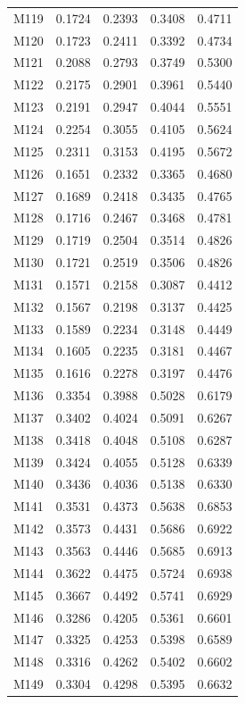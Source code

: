 \begin{longtable}{lrrrr}
M119 & 0.1724 & 0.2393 & 0.3408 & 0.4711 \\
M120 & 0.1723 & 0.2411 & 0.3392 & 0.4734 \\
M121 & 0.2088 & 0.2793 & 0.3749 & 0.5300 \\
M122 & 0.2175 & 0.2901 & 0.3961 & 0.5440 \\
M123 & 0.2191 & 0.2947 & 0.4044 & 0.5551 \\
M124 & 0.2254 & 0.3055 & 0.4105 & 0.5624 \\
M125 & 0.2311 & 0.3153 & 0.4195 & 0.5672 \\
M126 & 0.1651 & 0.2332 & 0.3365 & 0.4680 \\
M127 & 0.1689 & 0.2418 & 0.3435 & 0.4765 \\
M128 & 0.1716 & 0.2467 & 0.3468 & 0.4781 \\
M129 & 0.1719 & 0.2504 & 0.3514 & 0.4826 \\
M130 & 0.1721 & 0.2519 & 0.3506 & 0.4826 \\
M131 & 0.1571 & 0.2158 & 0.3087 & 0.4412 \\
M132 & 0.1567 & 0.2198 & 0.3137 & 0.4425 \\
M133 & 0.1589 & 0.2234 & 0.3148 & 0.4449 \\
M134 & 0.1605 & 0.2235 & 0.3181 & 0.4467 \\
M135 & 0.1616 & 0.2278 & 0.3197 & 0.4476 \\
M136 & 0.3354 & 0.3988 & 0.5028 & 0.6179 \\
M137 & 0.3402 & 0.4024 & 0.5091 & 0.6267 \\
M138 & 0.3418 & 0.4048 & 0.5108 & 0.6287 \\
M139 & 0.3424 & 0.4055 & 0.5128 & 0.6339 \\
M140 & 0.3436 & 0.4036 & 0.5138 & 0.6330 \\
M141 & 0.3531 & 0.4373 & 0.5638 & 0.6853 \\
M142 & 0.3573 & 0.4431 & 0.5686 & 0.6922 \\
M143 & 0.3563 & 0.4446 & 0.5685 & 0.6913 \\
M144 & 0.3622 & 0.4475 & 0.5724 & 0.6938 \\
M145 & 0.3667 & 0.4492 & 0.5741 & 0.6929 \\
M146 & 0.3286 & 0.4205 & 0.5361 & 0.6601 \\
M147 & 0.3325 & 0.4253 & 0.5398 & 0.6589 \\
M148 & 0.3316 & 0.4262 & 0.5402 & 0.6602 \\
M149 & 0.3304 & 0.4298 & 0.5395 & 0.6632 \\

\end{longtable}
